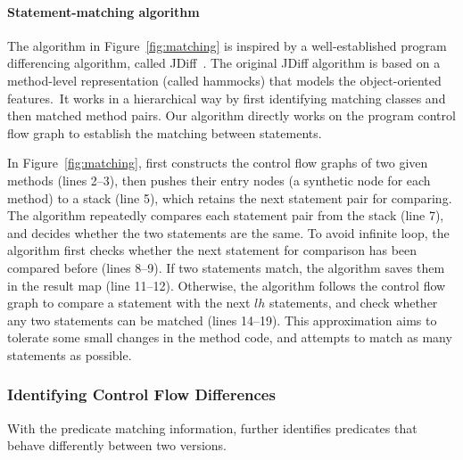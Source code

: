 
\paragraph{Statement-matching algorithm}

The algorithm in Figure~\ref{fig:matching} is inspired by
a well-established program differencing algorithm, called
JDiff~\cite{Apiwattanapong:2004}. The original JDiff
algorithm is based on a method-level representation
(called hammocks) that models the object-oriented features.\
It works in a hierarchical way by first identifying matching
classes and then matched method pairs. Our
algorithm directly works on the program control flow graph
to establish the matching between statements.

In Figure~\ref{fig:matching}, \ourtool first constructs the control
flow graphs of two given methods (lines 2--3), then pushes their
entry nodes (a synthetic node for each method) to a stack (line 5), which retains
the next statement pair for comparing. The algorithm repeatedly
compares each statement pair from the stack (line 7), and
decides whether the two statements are the same. To avoid infinite
loop, the algorithm first checks whether the next statement for comparison
has been compared before (lines 8--9). If two statements match,
the algorithm saves them in the result map (line 11--12). Otherwise,
the algorithm follows the control flow graph to compare a statement with
the next $lh$ statements, and check whether any two statements can be
matched (lines 14--19). This approximation aims to tolerate some small
changes in the method code, and attempts to match as many statements as possible.





\subsubsection{Identifying Control Flow Differences}
\label{sec:identify_diff}

With the predicate matching information, \ourtool further
identifies predicates that behave differently
between two versions. 


